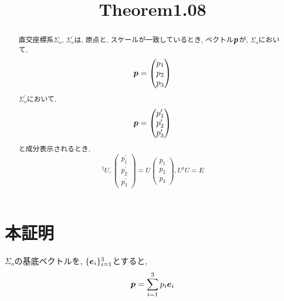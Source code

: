 \documentclass{jsarticle}
\title{Theorem1.08}
\newcommand*{\mbold}[1]{\mbox{\boldmath $#1$}}
\begin{document}
\maketitle

\begin{abstract}
  直交座標系$\Sigma_{o}$, $\Sigma^\prime_{o}$は, 原点と, スケールが一致しているとき, 
  ベクトル$\mbold{p}$が, 
  $\Sigma_{o}$において, 
  \[
    \mbold{p}
    =
    \begin{pmatrix}
      p_1 \\
      p_2 \\
      p_3
    \end{pmatrix}
  \]
  $\Sigma^\prime_{o}$において, 
  \[
    \mbold{p}
    =
    \begin{pmatrix}
      p^\prime_1 \\
      p^\prime_2 \\
      p^\prime_3
    \end{pmatrix}
  \]
  と成分表示されるとき, 
  \begin{equation}
    {}^\exists U, 
    \begin{pmatrix}
      p^\prime_1 \\
      p^\prime_2 \\
      p^\prime_3
    \end{pmatrix}
    = U
    \begin{pmatrix}
      p_1 \\
      p_2 \\
      p_3
    \end{pmatrix}
    ,
    U{}^t U = E
  \end{equation}
\end{abstract}

\section*{本証明}
$\Sigma_{o}$の基底ベクトルを, $\{ \mbold{e}_i \}_{i = 1}^{3}$とすると, 
\begin{equation}
  \mbold{p} = \sum_{i = 1}^3 p_i \mbold{e}_i
\end{equation}
\end{document}
